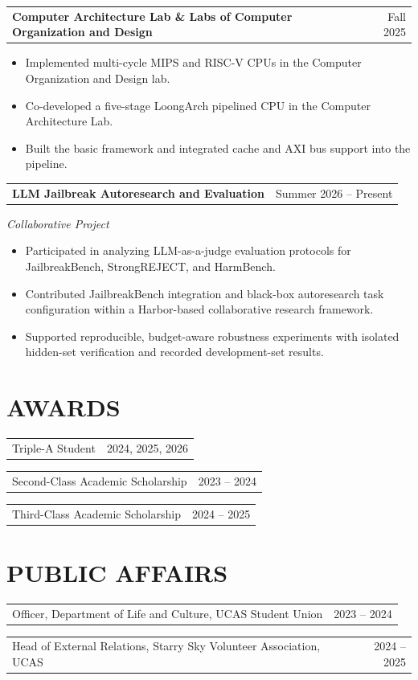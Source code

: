 \documentclass[11pt,a4paper]{article}
\makeatletter
\newcommand{\sectionicon}[1]{\raisebox{-0.08em}{\small #1}\hspace{0.45em}}
\newcommand{\project}[3]{%
  \begin{tabularx}{\textwidth}{@{}Xr@{}}
    {\headingfont\bfseries #1} & {\small\color{textgray}#2}
  \end{tabularx}%
}
\newcommand{\award}[2]{%
  \begin{tabularx}{\textwidth}{@{}Xr@{}}
    {#1} & {\small\color{textgray}#2}\\[-0.12em]
  \end{tabularx}\vspace{0.34em}%
}
\makeatother
\begin{document}
\vspace{0.5em}
\project{Computer Architecture Lab \& Labs of Computer Organization and Design}{Fall 2025}{https://github.com/heyu-wang/CA}
\begin{itemize}
  \item Implemented multi-cycle MIPS and RISC-V CPUs in the Computer Organization and Design lab.
  \item Co-developed a five-stage LoongArch pipelined CPU in the Computer Architecture Lab.
  \item Built the basic framework and integrated cache and AXI bus support into the pipeline.
\end{itemize}

\vspace{0.5em}
\project{LLM Jailbreak Autoresearch and Evaluation}{Summer 2026 -- Present}{}
{\small\itshape\color{textgray}Collaborative Project}\par
\begin{itemize}
  \item Participated in analyzing LLM-as-a-judge evaluation protocols for JailbreakBench, StrongREJECT, and HarmBench.
  \item Contributed JailbreakBench integration and black-box autoresearch task configuration within a Harbor-based collaborative research framework.
  \item Supported reproducible, budget-aware robustness experiments with isolated hidden-set verification and recorded development-set results.
\end{itemize}

\section[Awards]{\sectionicon{\faAward}\MakeUppercase{Awards}}
\award{Triple-A Student}{2024, 2025, 2026}
\award{Second-Class Academic Scholarship}{2023 -- 2024}
\award{Third-Class Academic Scholarship}{2024 -- 2025}

\section[Public Affairs]{\sectionicon{\faUsers}\MakeUppercase{Public Affairs}}
\award{Officer, Department of Life and Culture, UCAS Student Union}{2023 -- 2024}
\award{Head of External Relations, Starry Sky Volunteer Association, UCAS}{2024 -- 2025}
\end{document}
